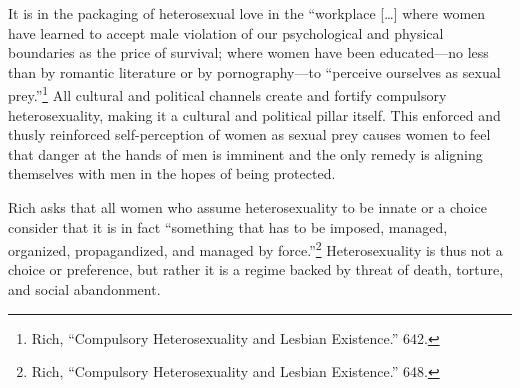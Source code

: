 It is in the packaging of heterosexual love in the ``workplace [\ldots]
where women have learned to accept male violation of our psychological
and physical boundaries as the price of survival; where women have been
educated---no less than by romantic literature or by pornography---to
``perceive ourselves as sexual prey.''\footnote{Rich, ``Compulsory
  Heterosexuality and Lesbian Existence.'' 642.} All cultural and
political channels create and fortify compulsory heterosexuality, making
it a cultural and political pillar itself. This enforced and thusly
reinforced self-perception of women as sexual prey causes women to feel
that danger at the hands of men is imminent and the only remedy is
aligning themselves with men in the hopes of being protected.

Rich asks that all women who assume heterosexuality to be innate or a
choice consider that it is in fact ``something that has to be imposed,
managed, organized, propagandized, and managed by force.''\footnote{Rich, ``Compulsory
  Heterosexuality and Lesbian Existence.'' 648.} Heterosexuality is thus not a choice or preference, but
rather it is a regime backed by threat of death, torture, and social
abandonment.

